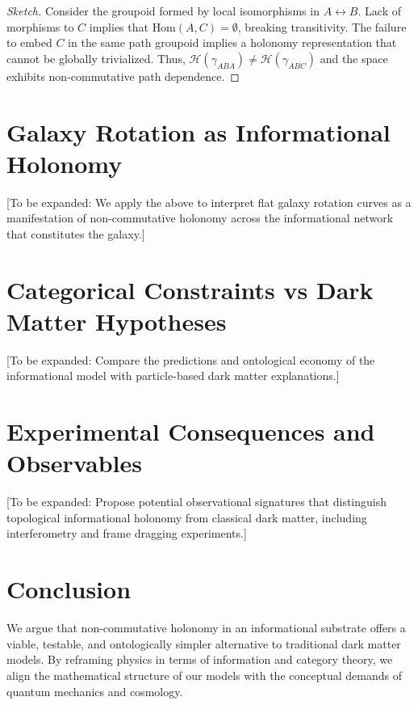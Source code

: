 \documentclass[11pt]{article}
\begin{document}
\begin{proof}[Sketch]
Consider the groupoid formed by local isomorphisms in \( A \leftrightarrow B \). Lack of morphisms to \( C \) implies that \( \text{Hom}(A, C) = \emptyset \), breaking transitivity. The failure to embed \( C \) in the same path groupoid implies a holonomy representation that cannot be globally trivialized. Thus, \( \mathcal{H}(\gamma_{ABA}) \neq \mathcal{H}(\gamma_{ABC}) \) and the space exhibits non-commutative path dependence.
\end{proof}

\section{Galaxy Rotation as Informational Holonomy}

[To be expanded: We apply the above to interpret flat galaxy rotation curves as a manifestation of non-commutative holonomy across the informational network that constitutes the galaxy.]

\section{Categorical Constraints vs Dark Matter Hypotheses}

[To be expanded: Compare the predictions and ontological economy of the informational model with particle-based dark matter explanations.]

\section{Experimental Consequences and Observables}

[To be expanded: Propose potential observational signatures that distinguish topological informational holonomy from classical dark matter, including interferometry and frame dragging experiments.]

\section{Conclusion}

We argue that non-commutative holonomy in an informational substrate offers a viable, testable, and ontologically simpler alternative to traditional dark matter models. By reframing physics in terms of information and category theory, we align the mathematical structure of our models with the conceptual demands of quantum mechanics and cosmology.



\end{document}
